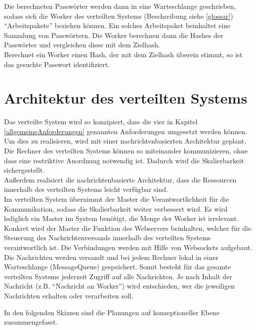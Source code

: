 Die berechneten Passwörter werden dann in eine Warteschlange geschrieben, sodass sich die Worker des verteilten Systems (Beschreibung siehe \ref{glossar}) \enquote{Arbeitspakete} beziehen können. Ein solches Arbeitspaket beinhaltet eine Sammlung von Passwörtern. Die Worker berechnen dann die Hashes der Passwörter und vergleichen diese mit dem Zielhash.\\
 Berechnet ein Worker einen Hash, der mit dem Zielhash überein stimmt, so ist das gesuchte Passwort identifiziert.  

\newpage

\section{Architektur des verteilten Systems}
Das verteilte System wird so konzipiert, dass die vier in Kapitel \ref{allgemeineAnforderungen} genannten Anforderungen umgesetzt werden können. Um dies zu realisieren, wird mit einer nachrichtenbasierten Architektur geplant. Die Rechner des verteilten Systems können so miteinander kommunizieren, ohne dass eine restriktive Anordnung notwendig ist. Dadurch wird die Skalierbarkeit sichergestellt. \\
Außerdem realisiert die nachrichtenbasierte Architektur, dass die Ressourcen innerhalb des verteilten Systems leicht verfügbar sind. \\
Im verteilten System übernimmt der Master die Verantwortlichkeit für die Kommunikation, sodass die Skalierbarkeit weiter verbessert wird. Es wird lediglich ein Master im System benötigt, die Menge der Worker ist irrelevant. Konkret wird der Master die Funktion des Webservers beinhalten, welcher für die Steuerung des Nachrichtenversands innerhalb des verteilten Systems verantwortlich ist. Die Verbindungen werden mit Hilfe von Websockets aufgebaut.\\
Die Nachrichten werden versandt und bei jedem Rechner lokal in einer Warteschlange (MessageQueue) gespeichert. Somit besteht für das gesamte verteilten Systems jederzeit Zugriff auf alle Nachrichten. Je nach Inhalt der Nachricht (z.B. \enquote{Nachricht an Worker}) wird entschieden, wer die jeweiligen Nachrichten erhalten oder verarbeiten soll. 

In den folgenden Skizzen sind die Planungen auf konzeptioneller Ebene zusammengefasst.





